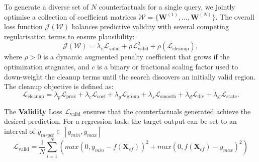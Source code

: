 \documentclass[runningheads]{llncs}
\begin{document}
	To generate a diverse set of \(N\) counterfactuals for a single query, we jointly optimise a collection of coefficient matrices \(\mathcal{W}=\{\mathbf{W}^{(1)},\dots,\mathbf{W}^{(N)}\}\). The overall loss function \(\mathcal{J}(\mathcal{W})\) balances predictive validity with several competing regularisation terms to ensure plausibility:
	\begin{equation}
		\label{eq:total_loss}
		\mathcal{J}(\mathcal{W}) = \lambda_v \mathcal{L}_{\mathrm{valid}} + \rho \mathcal{L}_{\mathrm{valid}}^2 + \rho \left( \mathcal{L}_{\mathrm{cleanup}} \right),
	\end{equation}
	where \(\rho > 0\) is a dynamic augmented penalty coefficient that grows if the optimization stagnates, and \(c\) is a binary or fractional scaling factor used to down-weight the cleanup terms until the search discovers an initially valid region. The cleanup objective is defined as:
	\begin{equation}
		\label{eq:cleanup_loss}
		\mathcal{L}_{\mathrm{cleanup}} = \lambda_p \mathcal{L}_{\mathrm{prox}} + \lambda_c \mathcal{L}_{\mathrm{coef}} + \lambda_g \mathcal{L}_{\mathrm{group}} + \lambda_s \mathcal{L}_{\mathrm{smooth}} + \lambda_d \mathcal{L}_{\mathrm{div}} + \lambda_{\mathrm{sl}} \mathcal{L}_{\mathrm{state}}.
	\end{equation}
	
	
	
	The \textbf{Validity} Loss $\mathcal{L}_{\text{valid}}$ ensures that the counterfactuals generated achieve the desired prediction. For a regression task, the target output can be set to  an interval of $y_{target} \in[y_{min}, y_{max}]$
	\begin{equation}
		\label{eq:cf_L_validity}
		\mathcal{L}_{\text{valid}} = \frac{1}{N} \sum_{i=1}^N \left( max(0,y_{min} - f(\mathbf{X}_{cf}))^2 + max(0, f(\mathbf{X}_{cf}) - y_{max})^2 \right)
	\end{equation}
	
\end{document}
